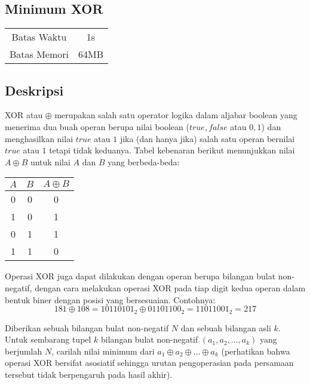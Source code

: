 \documentclass{article}
\begin{document}
\begin{center}
    \section*{Minimum XOR} %

    \begin{tabular}{ | c c | }
        \hline
        Batas Waktu  & 1s \\    %
        Batas Memori & 64MB \\  %
        \hline
    \end{tabular}
\end{center}

\subsection*{Deskripsi}
XOR atau $\oplus$ merupakan salah satu operator logika dalam aljabar boolean yang menerima dua buah operan berupa nilai boolean ($true, false$ atau $0, 1$) dan menghasilkan nilai $true$ atau $1$ jika (dan hanya jika) salah satu operan bernilai $true$ atau $1$ tetapi tidak keduanya. Tabel kebenaran berikut menunjukkan nilai $A \oplus B$ untuk nilai $A$ dan $B$ yang berbeda-beda: 

\begin{center}
\begin{tabular}{c|c|c}
$A$ & $B$ & $A \oplus  B$ \\ \hline
0 & 0 & 0       \\
1 & 0 & 1       \\
0 & 1 & 1       \\
1 & 1 & 0
\end{tabular}
\end{center}
Operasi XOR juga dapat dilakukan dengan operan berupa bilangan bulat non-negatif, dengan cara melakukan operasi XOR pada tiap digit kedua operan dalam bentuk biner dengan posisi yang bersesuaian. Contohnya:
$$ 181 \oplus 108 = 10110101_2 \oplus 01101100_2 = 11011001_2 = 217 $$

Diberikan sebuah bilangan bulat non-negatif $N$ dan sebuah bilangan asli $k$. Untuk sembarang tupel $k$ bilangan bulat non-negatif $(a_1, a_2, \ldots, a_k)$ yang berjumlah $N$, carilah nilai minimum dari $a_1 \oplus a_2 \oplus \ldots \oplus a_k$ (perhatikan bahwa operasi XOR bersifat asosiatif sehingga urutan pengoperasian pada persamaan tersebut tidak berpengaruh pada hasil akhir).
\end{document}
